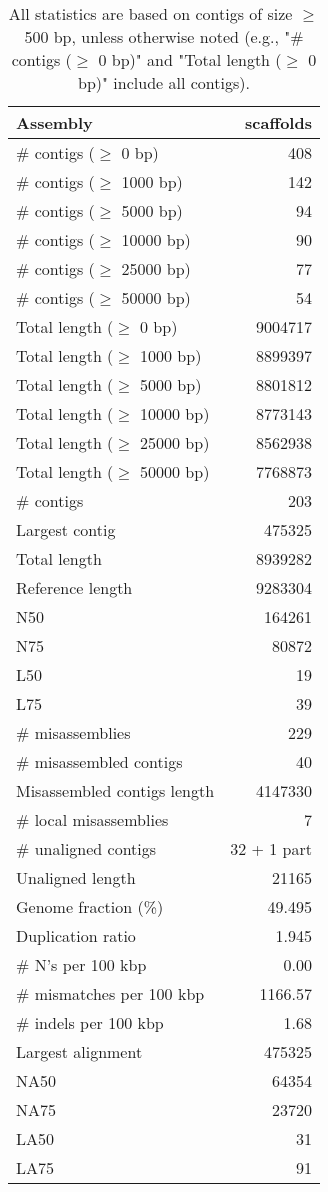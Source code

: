 \documentclass[12pt,a4paper]{article}
\begin{document}
\begin{table}[ht]
\begin{center}
\caption{All statistics are based on contigs of size $\geq$ 500 bp, unless otherwise noted (e.g., "\# contigs ($\geq$ 0 bp)" and "Total length ($\geq$ 0 bp)" include all contigs).}
\begin{tabular}{|l*{1}{|r}|}
\hline
Assembly & scaffolds \\ \hline
\# contigs ($\geq$ 0 bp) & 408 \\ \hline
\# contigs ($\geq$ 1000 bp) & 142 \\ \hline
\# contigs ($\geq$ 5000 bp) & 94 \\ \hline
\# contigs ($\geq$ 10000 bp) & 90 \\ \hline
\# contigs ($\geq$ 25000 bp) & 77 \\ \hline
\# contigs ($\geq$ 50000 bp) & 54 \\ \hline
Total length ($\geq$ 0 bp) & 9004717 \\ \hline
Total length ($\geq$ 1000 bp) & 8899397 \\ \hline
Total length ($\geq$ 5000 bp) & 8801812 \\ \hline
Total length ($\geq$ 10000 bp) & 8773143 \\ \hline
Total length ($\geq$ 25000 bp) & 8562938 \\ \hline
Total length ($\geq$ 50000 bp) & 7768873 \\ \hline
\# contigs & 203 \\ \hline
Largest contig & 475325 \\ \hline
Total length & 8939282 \\ \hline
Reference length & 9283304 \\ \hline
N50 & 164261 \\ \hline
N75 & 80872 \\ \hline
L50 & 19 \\ \hline
L75 & 39 \\ \hline
\# misassemblies & 229 \\ \hline
\# misassembled contigs & 40 \\ \hline
Misassembled contigs length & 4147330 \\ \hline
\# local misassemblies & 7 \\ \hline
\# unaligned contigs & 32 + 1 part \\ \hline
Unaligned length & 21165 \\ \hline
Genome fraction (\%) & 49.495 \\ \hline
Duplication ratio & 1.945 \\ \hline
\# N's per 100 kbp & 0.00 \\ \hline
\# mismatches per 100 kbp & 1166.57 \\ \hline
\# indels per 100 kbp & 1.68 \\ \hline
Largest alignment & 475325 \\ \hline
NA50 & 64354 \\ \hline
NA75 & 23720 \\ \hline
LA50 & 31 \\ \hline
LA75 & 91 \\ \hline
\end{tabular}
\end{center}
\end{table}
\end{document}
